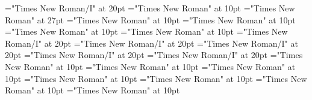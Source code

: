 \documentclass[a4paper]{article}
\begin{document}
 
\pagestyle{plain} 
\sloppy 
\font\pronunciationenUKpronunciationbefore="Times New Roman/I" at 20pt
\font\sectionletterdictionary="Times New Roman" at 10pt
\font\headsectionletterdictionary="Times New Roman" at 27pt
\font\articledictionary="Times New Roman" at 10pt
\font\firstoftypeheadwordlastoftypearticledictionary="Times New Roman" at 10pt
\font\firstoftypegrammarrequireslastoftypearticledictionary="Times New Roman" at 10pt
\font\firstoftypelastoftyperelationsynonymarticledictionary="Times New Roman" at 10pt
\font\firstoftypepronunciationenUKarticledictionary="Times New Roman/I" at 20pt
\font\pronunciationenUKpronunciationbeforearticledictionary="Times New Roman/I" at 20pt
\font\lastoftypepronunciationenUSarticledictionary="Times New Roman/I" at 20pt
\font\pronunciationpronunciationbeforearticledictionary="Times New Roman/I" at 20pt
\font\lastoftypepronunciationenUKarticledictionary="Times New Roman/I" at 20pt
\font\firstoftypegrammarcategorylastoftypearticledictionary="Times New Roman" at 10pt
\font{}="Times New Roman" at 10pt
\font\firstoftypelastoftypenotearticledictionary="Times New Roman" at 10pt
\font\exampleusefirstoftypearticledictionary="Times New Roman" at 10pt
\font\examplefirstoftypearticledictionary="Times New Roman" at 10pt
\font\exampleuselastoftypearticledictionary="Times New Roman" at 10pt
\font\examplelastoftypearticledictionary="Times New Roman" at 10pt

\pagestyle{fancy} 
\begin{center}
\end{center}

\pronunciationpronunciationbeforearticledictionary{, }
\end{document}
